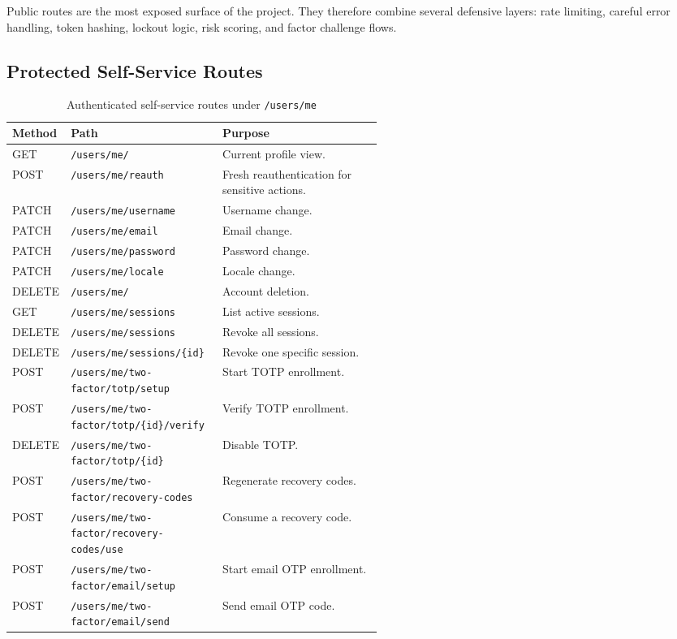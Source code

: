 \documentclass[11pt,a4paper]{article}
\newcommand{\route}[1]{\nolinkurl{#1}}
\begin{document}
Public routes are the most exposed surface of the project. They therefore combine several defensive layers: rate limiting, careful error handling, token hashing, lockout logic, risk scoring, and factor challenge flows.

\subsection{Protected Self-Service Routes}

\begin{table}[H]
\centering
\scriptsize
\caption{Authenticated self-service routes under \texttt{/users/me}}
\begin{tabularx}{\linewidth}{T{0.12\linewidth} T{0.41\linewidth} Y}
\toprule
Method & Path & Purpose \\
\midrule
GET & \route{/users/me/} & Current profile view. \\
POST & \route{/users/me/reauth} & Fresh reauthentication for sensitive actions. \\
PATCH & \route{/users/me/username} & Username change. \\
PATCH & \route{/users/me/email} & Email change. \\
PATCH & \route{/users/me/password} & Password change. \\
PATCH & \route{/users/me/locale} & Locale change. \\
DELETE & \route{/users/me/} & Account deletion. \\
GET & \route{/users/me/sessions} & List active sessions. \\
DELETE & \route{/users/me/sessions} & Revoke all sessions. \\
DELETE & \route{/users/me/sessions/\{id\}} & Revoke one specific session. \\
POST & \route{/users/me/two-factor/totp/setup} & Start TOTP enrollment. \\
POST & \route{/users/me/two-factor/totp/\{id\}/verify} & Verify TOTP enrollment. \\
DELETE & \route{/users/me/two-factor/totp/\{id\}} & Disable TOTP. \\
POST & \route{/users/me/two-factor/recovery-codes} & Regenerate recovery codes. \\
POST & \route{/users/me/two-factor/recovery-codes/use} & Consume a recovery code. \\
POST & \route{/users/me/two-factor/email/setup} & Start email OTP enrollment. \\
POST & \route{/users/me/two-factor/email/send} & Send email OTP code. \\

\end{tabularx}
\end{table}
\end{document}
